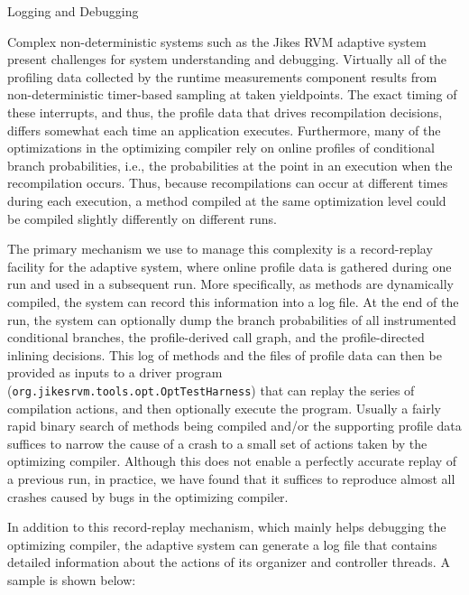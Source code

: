 \begin{section}{Logging and Debugging}
\label{sec:logginganddebugging}

Complex non-deterministic systems such as the Jikes RVM adaptive system present challenges for system understanding and debugging. Virtually all of the profiling data collected by the runtime measurements component results from non-deterministic timer-based sampling at taken yieldpoints. The exact timing of these interrupts, and thus, the profile data that drives recompilation decisions, differs somewhat each time an application executes. Furthermore, many of the optimizations in the optimizing compiler rely on online profiles of conditional branch probabilities, i.e., the probabilities at the point in an execution when the recompilation occurs. Thus, because recompilations can occur at different times during each execution, a method compiled at the same optimization level could be compiled slightly differently on different runs.

The primary mechanism we use to manage this complexity is a record-replay facility for the adaptive system, where online profile data is gathered during one run and used in a subsequent run. More specifically, as methods are dynamically compiled, the system can record this information into a log file. At the end of the run, the system can optionally dump the branch probabilities of all instrumented conditional branches, the profile-derived call graph, and the profile-directed inlining decisions. This log of methods and the files of profile data can then be provided as inputs to a driver program (\texttt{org.jikes\-rvm.tools.opt.Opt\-Test\-Har\-ness}) that can replay the series of compilation actions, and then optionally execute the program. Usually a fairly rapid binary search of methods being compiled and/or the supporting profile data suffices to narrow the cause of a crash to a small set of actions taken by the optimizing compiler. Although this does not enable a perfectly accurate replay of a previous run, in practice, we have found that it suffices to reproduce almost all crashes caused by bugs in the optimizing compiler.

In addition to this record-replay mechanism, which mainly helps debugging the optimizing compiler, the adaptive system can generate a log file that contains detailed information about the actions of its organizer and controller threads. A sample is shown below:


\end{section}
